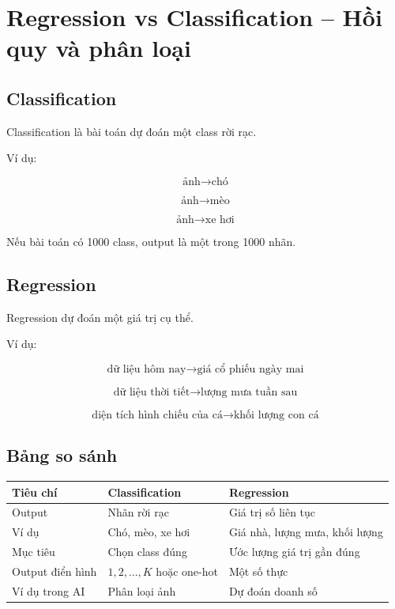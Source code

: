 \section{Regression vs Classification -- Hồi quy và phân loại}

\subsection{Classification}

Classification là bài toán dự đoán một class rời rạc.

Ví dụ:

\[
    \text{ảnh}
    \rightarrow
    \text{chó}
\]

\[
    \text{ảnh}
    \rightarrow
    \text{mèo}
\]

\[
    \text{ảnh}
    \rightarrow
    \text{xe hơi}
\]

Nếu bài toán có 1000 class, output là một trong 1000 nhãn.

\subsection{Regression}

Regression dự đoán một giá trị cụ thể.

Ví dụ:

\[
    \text{dữ liệu hôm nay}
    \rightarrow
    \text{giá cổ phiếu ngày mai}
\]

\[
    \text{dữ liệu thời tiết}
    \rightarrow
    \text{lượng mưa tuần sau}
\]

\[
    \text{diện tích hình chiếu của cá}
    \rightarrow
    \text{khối lượng con cá}
\]

\subsection{Bảng so sánh}

\begin{center}
\begin{tabular}{p{}p{}p{}}
\toprule
Tiêu chí & Classification & Regression \\
\midrule
Output & Nhãn rời rạc & Giá trị số liên tục \\
Ví dụ & Chó, mèo, xe hơi & Giá nhà, lượng mưa, khối lượng \\
Mục tiêu & Chọn class đúng & Ước lượng giá trị gần đúng \\
Output điển hình & $1,2,\ldots,K$ hoặc one-hot & Một số thực \\
Ví dụ trong AI & Phân loại ảnh & Dự đoán doanh số \\
\bottomrule
\end{tabular}
\end{center}

